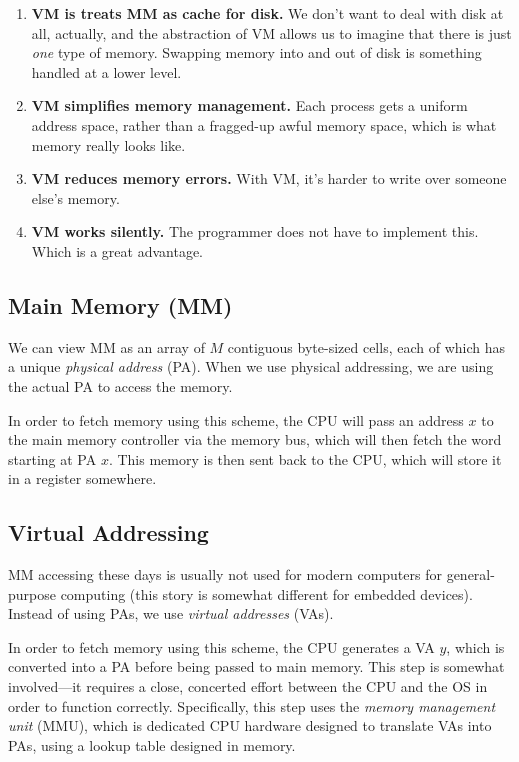 \documentclass[fleqn]{article}
\begin{document}
\begin{enumerate}
\item \textbf{VM is treats MM as cache for disk.} We don't want to deal with disk at all, actually, and the abstraction of VM allows us to imagine that there is just \textit{one} type of memory. Swapping memory into and out of disk is something handled at a lower level.

\item \textbf{VM simplifies memory management.} Each process gets a uniform address space, rather than a fragged-up awful memory space, which is what memory really looks like.

\item \textbf{VM reduces memory errors.} With VM, it's harder to write over someone else's memory.

\item \textbf{VM works silently.} The programmer does not have to implement this. Which is a great advantage.
\end{enumerate}

\subsection{Main Memory (MM)}

We can view MM as an array of $M$ contiguous byte-sized cells, each of which has a unique \textit{physical address} (PA). When we use physical addressing, we are using the actual PA to access the memory.

In order to fetch memory using this scheme, the CPU will pass an address $x$ to the main memory controller via the memory bus, which will then fetch the word starting at PA $x$. This memory is then sent back to the CPU, which will store it in a register somewhere.

\subsection{Virtual Addressing}

MM accessing these days is usually not used for modern computers for general-purpose computing (this story is somewhat different for embedded devices). Instead of using PAs, we use \textit{virtual addresses} (VAs).

In order to fetch memory using this scheme, the CPU generates a VA $y$, which is converted into a PA before being passed to main memory. This step is somewhat involved---it requires a close, concerted effort between the CPU and the OS in order to function correctly. Specifically, this step uses the \textit{memory management unit} (MMU), which is dedicated CPU hardware designed to translate VAs into PAs, using a lookup table designed in memory.
\end{document}
